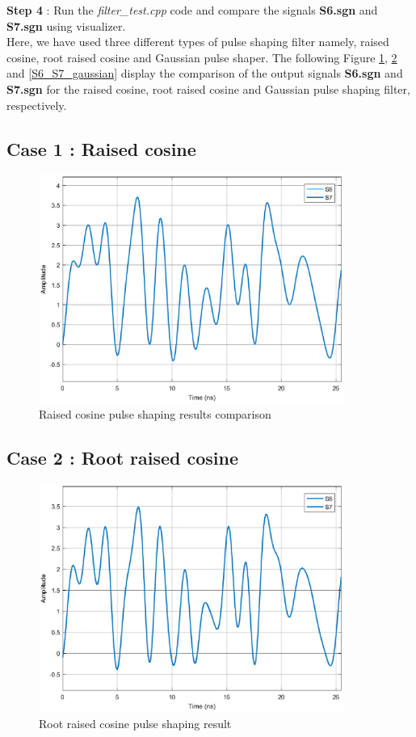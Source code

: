 \begin{refsection}
\textbf{Step 4} : Run the \textit{filter\_test.cpp} code and compare the  signals \textbf{S6.sgn} and \textbf{S7.sgn} using visualizer.\\
Here, we have used three different types of pulse shaping filter namely, raised cosine, root raised cosine and Gaussian pulse shaper. The following Figure \ref{S6_S7}, \ref{S6_S7_RRCOS}  and \ref{S6_S7_gaussian} display the comparison of the output signals \textbf{S6.sgn} and \textbf{S7.sgn} for the raised cosine, root raised cosine and Gaussian pulse shaping filter, respectively. 

\subsection*{Case 1 : Raised cosine}
\begin{figure}[h]
	\centering
	\includegraphics[width=10cm]{./algorithms/filter/figures/RC_S6S7.eps}
	\caption{Raised cosine pulse shaping results comparison}
	\label{S6_S7}
\end{figure}

\subsection*{Case 2 : Root raised cosine}
\begin{figure}[h]
	\centering
	\includegraphics[width=10cm]{./algorithms/filter/figures/RRC_S6S7.eps}
	\caption{Root raised cosine pulse shaping result}
	\label{S6_S7_RRCOS}
\end{figure}


\end{refsection}
